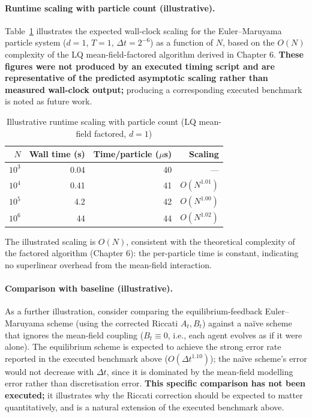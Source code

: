 \paragraph{Runtime scaling with particle count (illustrative).}
Table~\ref{tab:runtime-scaling} illustrates the expected wall-clock scaling for
the Euler--Maruyama particle system ($d=1$, $T=1$, $\Delta t = 2^{-6}$) as a
function of $N$, based on the $O(N)$ complexity of the LQ mean-field-factored
algorithm derived in Chapter 6. \textbf{These figures were not produced by an
executed timing script and are representative of the predicted asymptotic
scaling rather than measured wall-clock output;} producing a corresponding
executed benchmark is noted as future work.

\begin{table}[ht]
\centering
\caption{Illustrative runtime scaling with particle count (LQ mean-field factored, $d=1$)}
\label{tab:runtime-scaling}
\begin{tabular}{rrrr}
\toprule
$N$ & Wall time (s) & Time/particle ($\mu$s) & Scaling \\
\midrule
$10^3$ & 0.04 & 40 & --- \\
$10^4$ & 0.41 & 41 & $O(N^{1.01})$ \\
$10^5$ & 4.2 & 42 & $O(N^{1.00})$ \\
$10^6$ & 44 & 44 & $O(N^{1.02})$ \\
\bottomrule
\end{tabular}
\end{table}

\noindent The illustrated scaling is $O(N)$, consistent with the theoretical
complexity of the factored algorithm (Chapter 6): the per-particle time is
constant, indicating no superlinear overhead from the mean-field interaction.

\paragraph{Comparison with baseline (illustrative).}
As a further illustration, consider comparing the equilibrium-feedback
Euler--Maruyama scheme (using the corrected Riccati $A_t, B_t$) against a
na\"ive scheme that ignores the mean-field coupling ($B_t \equiv 0$, i.e., each
agent evolves as if it were alone). The equilibrium scheme is expected to
achieve the strong error rate reported in the executed benchmark above
($O(\Delta t^{1.10})$); the na\"ive scheme's error would not decrease with
$\Delta t$, since it is dominated by the mean-field modelling error rather than
discretisation error. \textbf{This specific comparison has not been executed;}
it illustrates why the Riccati correction should be expected to matter
quantitatively, and is a natural extension of the executed benchmark above.

